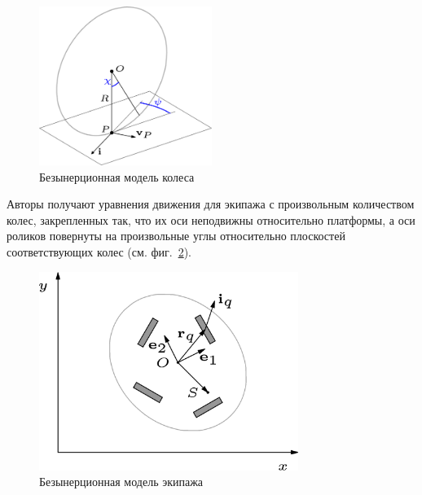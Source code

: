 \begin{figure}[ht!]
    \centering
    \includegraphics[width=0.5\textwidth]{content/pic/asy/wheel_bor.png}
    \caption{Безынерционная модель колеса}
    \label{fig:bor_wheel_scheme}
\end{figure}

Авторы \cite{Borisov2011} получают уравнения движения для экипажа с произвольным количеством колес, закрепленных так, что их оси неподвижны относительно платформы, а оси роликов повернуты на произвольные углы относительно плоскостей соответствующих колес (см. фиг.~\ref{fig:bor_vehicle}).

\begin{figure}[ht!]
    \centering
    \includegraphics[width=0.75\textwidth]{content/pic/asy/cart_bor.png}
    \caption{Безынерционная модель экипажа}
    \label{fig:bor_vehicle}
\end{figure}

